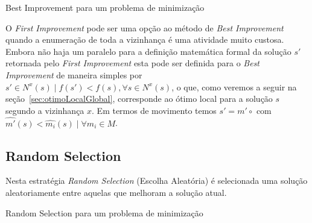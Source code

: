 \begin{algorithm}[htpb]
\caption{Best Improvement para um problema de minimização}
\label{alg:bestImprovement}
\begin{algorithmic}[1]
         
         
             
            \EndIf
        \EndFor
         
    \EndFunction
\end{algorithmic}
\end{algorithm}

O \textit{First Improvement} pode ser uma opção ao método de \textit{Best Improvement} quando a enumeração de toda a vizinhança é uma atividade muito custosa.
Embora não haja um paralelo para a definição matemática formal da solução $s'$ retornada pelo \textit{First Improvement} esta pode ser definida para o \textit{Best Improvement} de maneira simples por $s' \in N^x(s) \mid f(s') < f(s), \forall s \in N^x(s)$, o que, como veremos a seguir na seção~\ref{sec:otimoLocalGlobal}, corresponde ao ótimo local para a solução $s$ segundo a vizinhança $x$.
Em termos de movimento temos $s' = m' \circ$ com $\widehat{m'}(s) < \widehat{m_i}(s) \mid \forall m_i \in M$.

\subsection{Random Selection}

Nesta estratégia \textit{Random Selection} (Escolha Aleatória) é selecionada uma solução aleatoriamente entre aquelas que melhoram a solução atual.

\begin{algorithm}[htpb]
\caption{Random Selection para um problema de minimização}
\label{alg:randomSelection}
\begin{algorithmic}[1]
         
         
             
                 \label{alg:randomSelection:salvaMelhora} 
            \EndIf
        \EndFor
         
    \EndFunction
\end{algorithmic}
\end{algorithm}

